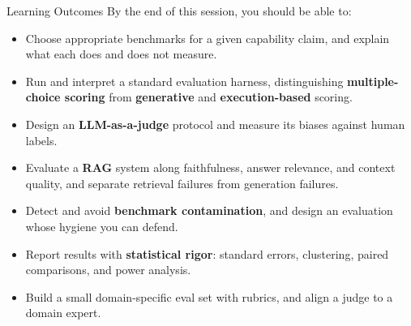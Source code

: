 \begin{frame}[allowframebreaks]{Learning Outcomes}
  By the end of this session, you should be able to:
  \vspace{0.6em}
  \begin{itemize}\itemsep0.42em
    \item[\textcolor{red}{$\blacktriangleright$}] Choose appropriate benchmarks for a given capability claim, and explain what each does and does not measure.
    \item[\textcolor{red}{$\blacktriangleright$}] Run and interpret a standard evaluation harness, distinguishing \textbf{multiple-choice scoring} from \textbf{generative} and \textbf{execution-based} scoring.
    \item[\textcolor{red}{$\blacktriangleright$}] Design an \textbf{LLM-as-a-judge} protocol and measure its biases against human labels.
    \item[\textcolor{red}{$\blacktriangleright$}] Evaluate a \textbf{RAG} system along faithfulness, answer relevance, and context quality, and separate retrieval failures from generation failures.
    \item[\textcolor{red}{$\blacktriangleright$}] Detect and avoid \textbf{benchmark contamination}, and design an evaluation whose hygiene you can defend.
    \item[\textcolor{red}{$\blacktriangleright$}] Report results with \textbf{statistical rigor}: standard errors, clustering, paired comparisons, and power analysis.
    \item[\textcolor{red}{$\blacktriangleright$}] Build a small domain-specific eval set with rubrics, and align a judge to a domain expert.
  \end{itemize}
\end{frame}
